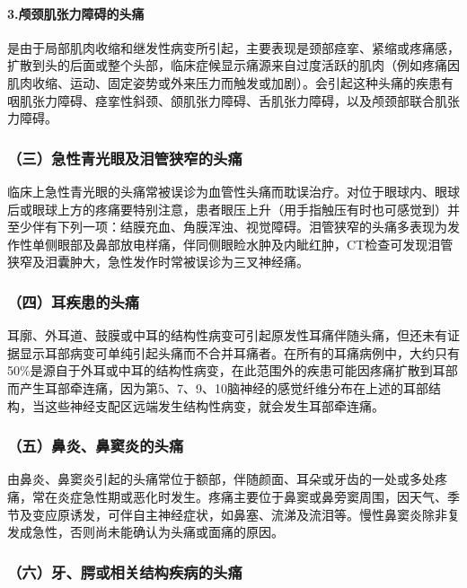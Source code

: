 \paragraph{3.颅颈肌张力障碍的头痛}

是由于局部肌肉收缩和继发性病变所引起，主要表现是颈部痉挛、紧缩或疼痛感，扩散到头的后面或整个头部，临床症候显示痛源来自过度活跃的肌肉（例如疼痛因肌肉收缩、运动、固定姿势或外来压力而触发或加剧）。会引起这种头痛的疾患有咽肌张力障碍、痉挛性斜颈、颌肌张力障碍、舌肌张力障碍，以及颅颈部联合肌张力障碍。

\subsubsection{（三）急性青光眼及泪管狭窄的头痛}

临床上急性青光眼的头痛常被误诊为血管性头痛而耽误治疗。对位于眼球内、眼球后或眼球上方的疼痛要特别注意，患者眼压上升（用手指触压有时也可感觉到）并至少伴有下列一项：结膜充血、角膜浑浊、视觉障碍。泪管狭窄的头痛多表现为发作性单侧眼部及鼻部放电样痛，伴同侧眼睑水肿及内眦红肿，CT检查可发现泪管狭窄及泪囊肿大，急性发作时常被误诊为三叉神经痛。

\subsubsection{（四）耳疾患的头痛}

耳廓、外耳道、鼓膜或中耳的结构性病变可引起原发性耳痛伴随头痛，但还未有证据显示耳部病变可单纯引起头痛而不合并耳痛者。在所有的耳痛病例中，大约只有50\%是源自于外耳或中耳的结构性病变，在此范围外的疾患可能因疼痛扩散到耳部而产生耳部牵连痛，因为第5、7、9、10脑神经的感觉纤维分布在上述的耳部结构，当这些神经支配区远端发生结构性病变，就会发生耳部牵连痛。

\subsubsection{（五）鼻炎、鼻窦炎的头痛}

由鼻炎、鼻窦炎引起的头痛常位于额部，伴随颜面、耳朵或牙齿的一处或多处疼痛，常在炎症急性期或恶化时发生。疼痛主要位于鼻窦或鼻旁窦周围，因天气、季节及变应原诱发，可伴自主神经症状，如鼻塞、流涕及流泪等。慢性鼻窦炎除非复发成急性，否则尚未能确认为头痛或面痛的原因。

\subsubsection{（六）牙、腭或相关结构疾病的头痛}

